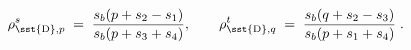 \begin{equation}
\rho_{\sst{\rm D},p}^{s}\;=\;\frac{s_b(p+s_2-s_1)}{s_b(p+s_3+s_4)},\qquad
\rho_{\sst{\rm D},q}^{t}\;=\;\frac{s_b(q+s_2-s_3)}{s_b(p+s_1+s_4)}\;.
\end{equation}

